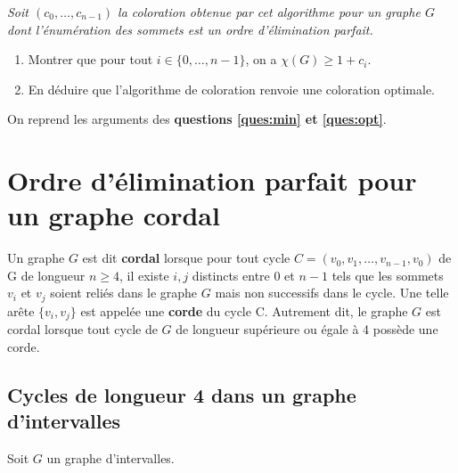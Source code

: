\begin{Exercise}\it
Soit $(c_0,\dots,c_{n-1})$ la coloration obtenue par cet
algorithme pour un graphe $G$ dont l'énumération des sommets est un
ordre d'élimination parfait.
\begin{enumerate}
\item  Montrer que pour tout $i\in \{0,\dots,n-1\}$, on a   $\chi(G)\ge  1+c_i$.
\item En déduire que l'algorithme de coloration renvoie une   coloration optimale.
\end{enumerate}
\end{Exercise}  
\begin{Answer}
On reprend les arguments des {\bf questions \ref{ques:min} et \ref{ques:opt}}.
\end{Answer}
\section{Ordre d'élimination parfait pour un graphe cordal}
Un graphe $G$ est dit {\bf cordal} lorsque pour tout cycle $C=(v_0,v_1,\dots,v_{n-1},v_0)$ de G de longueur $n\ge  4$, il existe $i,j$ distincts entre $0$ et $n-1$ tels que les sommets $v_i$ et $v_j$ soient reliés dans le graphe $G$ mais non successifs dans le cycle. Une telle arête $\{v_i,v_j\}$ est appelée une {\bf corde} du cycle C. Autrement dit, le graphe $G$ est cordal lorsque tout cycle de $G$ de longueur supérieure ou égale à 4 possède une corde.
\subsection{Cycles de longueur 4 dans un graphe d'intervalles}
Soit $G$ un graphe d'intervalles. 

